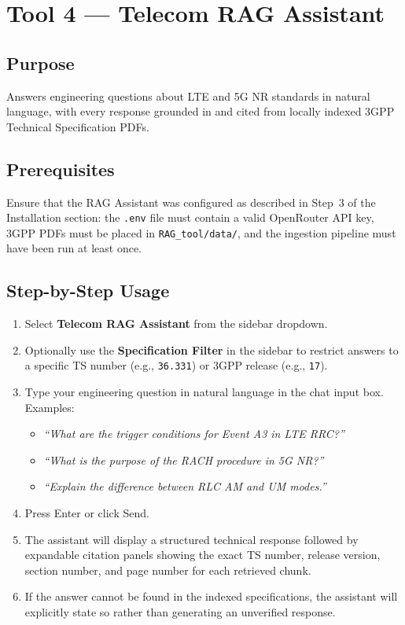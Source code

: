 \section{Tool 4 — Telecom RAG Assistant}

\subsection{Purpose}

Answers engineering questions about LTE and 5G NR standards in natural language, with every response grounded in and cited from locally indexed 3GPP Technical Specification PDFs.

\subsection{Prerequisites}

Ensure that the RAG Assistant was configured as described in Step~3 of the Installation section: the \texttt{.env} file must contain a valid OpenRouter API key, 3GPP PDFs must be placed in \texttt{RAG\_tool/data/}, and the ingestion pipeline must have been run at least once.

\subsection{Step-by-Step Usage}

\begin{enumerate}
    \item Select \textbf{Telecom RAG Assistant} from the sidebar dropdown.
    \item Optionally use the \textbf{Specification Filter} in the sidebar to restrict answers to a specific TS number (e.g., \texttt{36.331}) or 3GPP release (e.g., \texttt{17}).
    \item Type your engineering question in natural language in the chat input box. Examples:
        \begin{itemize}
            \item \textit{``What are the trigger conditions for Event A3 in LTE RRC?''}
            \item \textit{``What is the purpose of the RACH procedure in 5G NR?''}
            \item \textit{``Explain the difference between RLC AM and UM modes.''}
        \end{itemize}
    \item Press Enter or click Send.
    \item The assistant will display a structured technical response followed by expandable citation panels showing the exact TS number, release version, section number, and page number for each retrieved chunk.
    \item If the answer cannot be found in the indexed specifications, the assistant will explicitly state so rather than generating an unverified response.
\end{enumerate}

